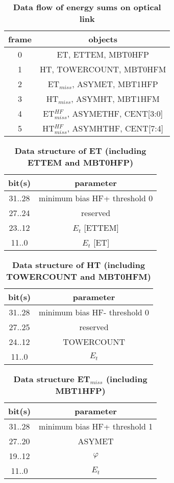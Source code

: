 \documentclass{cmspaper}
\begin{document}
\begin{table}[htdp]
\caption{\bf Data flow of energy sums on optical link}
\vspace{5mm}
\centering
\begin{tabular}{|c|c|}\hline
frame & objects \\\hline\hline
0 & ET, ETTEM, MBT0HFP \\\hline
1 & HT, TOWERCOUNT, MBT0HFM \\\hline
2 & ET$_{miss}$, ASYMET, MBT1HFP \\\hline
3 & HT$_{miss}$, ASYMHT, MBT1HFM \\\hline
4 & ET$_{miss}^{HF}$, ASYMETHF, CENT[3:0] \\\hline
5 & HT$_{miss}^{HF}$, ASYMHTHF, CENT[7:4] \\\hline
\end{tabular}
\label{table:opt_link_esums}
\end{table}

\begin{table}[ht]
\caption{\bf Data structure of ET \rm(including ETTEM and MBT0HFP)}
\vspace{5mm}
\centering
\begin{tabular}{|c|c|}\hline
bit(s) & parameter \\\hline\hline
31..28 & minimum bias HF+ threshold 0 \\
27..24 & reserved \\
23..12 & $E_t$ [ETTEM] \\
11..0 & $E_t$ [ET] \\\hline
\end{tabular}
\label{table:ett_object}
\end{table}

\begin{table}[ht]
\caption{\bf Data structure of HT \rm(including TOWERCOUNT and MBT0HFM)}
\vspace{5mm}
\centering
\begin{tabular}{|c|c|}\hline
bit(s) & parameter \\\hline\hline
31..28 & minimum bias HF- threshold 0 \\
27..25 & reserved \\
24..12 & TOWERCOUNT \\
11..0 & $E_t$ \\\hline
\end{tabular}
\label{table:ht_object}
\end{table}

\begin{table}[ht]
\caption{\bf Data structure ET$_{miss}$ \rm(including MBT1HFP)}
\vspace{5mm}
\centering
\begin{tabular}{|c|c|}\hline
bit(s) & parameter \\\hline\hline
31..28 & minimum bias HF+ threshold 1 \\
27..20 & ASYMET \\
19..12 & $\varphi$ \\
11..0 & $E_t$ \\\hline
\end{tabular}
\label{table:etm_object}
\end{table}
\end{document}

